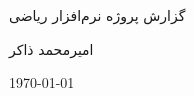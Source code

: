 \documentclass[12pt]{article}
\begin{document}
\begin{titlepage}
\centering
\vspace*{2cm}
{\Large گزارش پروژه نرم‌افزار ریاضی\par}
\vspace{1cm}
{\large امیرمحمد ذاکر\par}
\vfill
{\large \today\par}
\end{titlepage}

\tableofcontents
\clearpage


\clearpage

\clearpage

\clearpage

\end{document}
